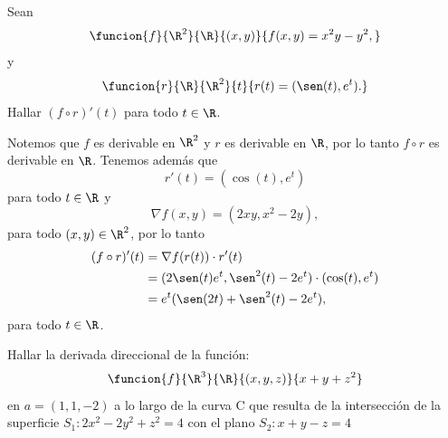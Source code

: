 \documentclass[a4,11pt]{aleph-examen}
\begin{document}
\begin{preguntas}
\begin{respuesta}
\begin{respuesta}

\item Sean 
	\[
        \funcion{f}{\R^2}{\R}
        {(x,y)}{f(x,y) = x^2 y - y^2,}
	\]
    y 
    \[
        \funcion{r}{\R}{\R^2}
        {t}{r(t) = (\sen(t), e^t).}
	\]
    Hallar $(f \circ r)'(t)$ para todo $t\in\R$.

\begin{respuesta}
    Notemos que $f$ es derivable en $\R^2$ y $r$ es derivable en $\R$, por lo tanto $f\circ r$ es derivable en $\R$. Tenemos además que
    \[
        r'(t)=(\cos(t), e^t)
    \]
    para todo $t\in\R$ y
    \[
        \nabla f(x,y) = (2xy, x^2 - 2y),
    \]
    para todo $(x,y)\in\R^2$, por lo tanto
    \begin{align*}
        (f \circ r)'(t) 
            &= \nabla f(r(t)) \cdot r'(t)\\
    		&= (2\sen(t) e^t, \sen^2(t) - 2e^t)\cdot (\cos(t), e^t)\\
            &= e^t(\sen(2t) + \sen^2(t) - 2e^t),
    \end{align*}
    para todo $t\in\R$.
\end{respuesta}

\item
Hallar la derivada direccional de la función:
	\[
        \funcion{f}{\R^3}{\R}{(x,y,z)}
        {x+y+z^2}
    \]
en $a=(1,1,-2)$ a lo largo de la curva C que resulta de la intersección de la superficie $S_1:2x^2-2y^2+z^2=4$ con el plano $S_2:x+y-z=4$  


\end{respuesta}
\end{respuesta}
\end{preguntas}
\end{document}
